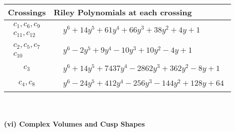 \documentclass[1p]{elsarticle_modified}
\theoremstyle{definition}
\begin{document}
\begin{tabular}{m{50pt}|m{274pt}}
Crossings & \hspace{64pt}Riley Polynomials at each crossing \\
\hline $$\begin{aligned}c_{1},c_{6},c_{9}\\c_{11},c_{12}\end{aligned}$$&$\begin{aligned}
&y^6+14 y^5+61 y^4+66 y^3+38 y^2+4 y+1
\end{aligned}$\\
\hline $$\begin{aligned}c_{2},c_{5},c_{7}\\c_{10}\end{aligned}$$&$\begin{aligned}
&y^6-2 y^5+9 y^4-10 y^3+10 y^2-4 y+1
\end{aligned}$\\
\hline $$\begin{aligned}c_{3}\end{aligned}$$&$\begin{aligned}
&y^6+14 y^5+7437 y^4-2862 y^3+362 y^2-8 y+1
\end{aligned}$\\
\hline $$\begin{aligned}c_{4},c_{8}\end{aligned}$$&$\begin{aligned}
&y^6-24 y^5+412 y^4-256 y^3-144 y^2+128 y+64
\end{aligned}$\\
\hline
\end{tabular}\\~\\
\newpage\flushleft \textbf{(vi) Complex Volumes and Cusp Shapes}
\end{document}
